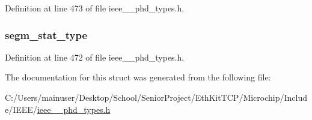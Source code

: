 Definition at line 473 of file ieee\+\_\+\_\+phd\+\_\+types.\+h.

\hypertarget{struct___segment_statistic_entry_ab657117d49724d0e6efec804506a7b5d}{}
\subsubsection[{segm\+\_\+stat\+\_\+type}]{ segm\+\_\+stat\+\_\+type}\label{struct___segment_statistic_entry_ab657117d49724d0e6efec804506a7b5d}


Definition at line 472 of file ieee\+\_\+\_\+phd\+\_\+types.\+h.



The documentation for this struct was generated from the following file\+:\begin{DoxyCompactItemize}
\item 
C\+:/\+Users/mainuser/\+Desktop/\+School/\+Senior\+Project/\+Eth\+Kit\+T\+C\+P/\+Microchip/\+Include/\+I\+E\+E\+E/\hyperlink{ieee__11073__phd__types_8h}{ieee\+\_\+\_\+phd\+\_\+types.\+h}\end{DoxyCompactItemize}
